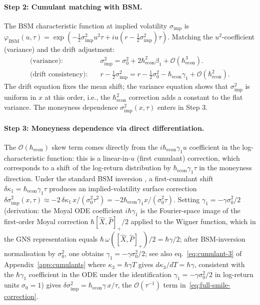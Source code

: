 \paragraph{Step 2: Cumulant matching with BSM.}
The BSM characteristic function at implied volatility $\sigma_{\mathrm{imp}}$
is $\varphi_{\mathrm{BSM}}(u,\tau) = \exp(-\tfrac{1}{2}\sigma_{\mathrm{imp}}^2
u^2 \tau + i u(r-\tfrac{1}{2}\sigma_{\mathrm{imp}}^2)\tau)$.
Matching the $u^2$-coefficient (variance) and the drift adjustment:
\begin{align*}
    \text{(variance):} &\quad
      \sigma_{\mathrm{imp}}^2
      = \sigma_0^2 + 2\hbar_{\mathrm{econ}}^2 \beta_1
      + \mathcal{O}(\hbar_{\mathrm{econ}}^3). \\
    \text{(drift consistency):} &\quad
      r - \tfrac{1}{2}\sigma_{\mathrm{imp}}^2
      = r - \tfrac{1}{2}\sigma_0^2 - \hbar_{\mathrm{econ}}\gamma_1
      + \mathcal{O}(\hbar_{\mathrm{econ}}^2).
\end{align*}
The drift equation fixes the mean shift; the variance equation shows that
$\sigma_{\mathrm{imp}}^2$ is uniform in $x$ at this order, i.e., the
$\hbar_{\mathrm{econ}}^2$ correction adds a constant to the flat variance.
The moneyness dependence $\sigma_{\mathrm{imp}}^2(x,\tau)$ enters in Step 3.

\paragraph{Step 3: Moneyness dependence via direct differentiation.}
The $\mathcal{O}(\hbar_{\mathrm{econ}})$ skew term comes directly from the
$i\hbar_{\mathrm{econ}}\gamma_1 u$ coefficient in the log-characteristic
function: this is a linear-in-$u$ (first cumulant) correction, which
corresponds to a shift of the log-return distribution by
$\hbar_{\mathrm{econ}}\gamma_1\tau$ in the moneyness direction.
Under the standard BSM inversion \citep{backus2004accounting}, a first-cumulant
shift $\delta\kappa_1 = \hbar_{\mathrm{econ}}\gamma_1\tau$ produces an
implied-volatility surface correction
$\delta\sigma_{\mathrm{imp}}^2(x,\tau) \approx
-2\,\delta\kappa_1\,x/(\sigma_0^2\tau^2)
= -2\hbar_{\mathrm{econ}}\gamma_1 x / (\sigma_0^2\tau)$.
Setting $\gamma_1 = -\gamma\sigma_0^2/2$ (derivation: the Moyal ODE coefficient
$i\hbar\gamma_1$ is the Fourier-space image of the first-order Moyal correction
$\hbar[\hat{X},\hat{P}]_+/2$ applied to the Wigner function, which in the GNS
representation equals $\hbar\,\omega([\hat{X},\hat{P}]_+)/2 = \hbar\gamma/2$;
after BSM-inversion normalisation by $\sigma_0^2$, one obtains
$\gamma_1 = -\gamma\sigma_0^2/2$; see also eq.~\eqref{eq:cumulant-3} of
Appendix~\ref{app:cumulants} where $\kappa_3 = \hbar\gamma T$ gives
$d\kappa_3/dT = \hbar\gamma$, consistent with the $\hbar\gamma_1$ coefficient
in the ODE under the identification $\gamma_1=-\gamma\sigma_0^2/2$
in log-return units $\sigma_0=1$) gives
$\delta\sigma_{\mathrm{imp}}^2 = \hbar_{\mathrm{econ}}\gamma\,x/\tau$,
the $\mathcal{O}(\tau^{-1})$ term in~\eqref{eq:full-smile-correction}.


